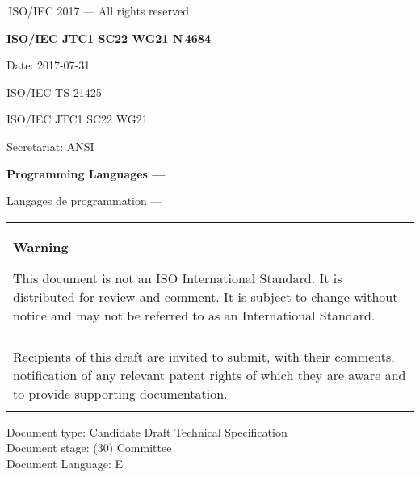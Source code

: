 

\thispagestyle{empty}
{\raisebox{.35ex}{\smaller\copyright}}\,ISO/IEC 2017 --- All rights reserved
\vspace{2ex}

\begin{flushright}
\textbf{ISO/IEC JTC1 SC22 WG21 N\,\LARGE4684}

Date: 2017-07-31

ISO/IEC TS 21425

ISO/IEC JTC1 SC22 WG21

Secretariat: ANSI

\end{flushright}

\vfill

\textbf{\LARGE Programming Languages --- \doctitle}

Langages de programmation --- \frtitle

\vfill

\begin{tabular}{|p{\hsize}|}
\hline
\begin{center}
\textbf{Warning}
\end{center}

\vspace{2ex}

This document is not an ISO International Standard. It is distributed
for review and comment. It is subject to change without notice and may
not be referred to as an International Standard.\\\\

Recipients of this draft are invited to submit, with their comments,
notification of any relevant patent rights of which they are aware
and to provide supporting documentation.\\\\
\hline
\end{tabular}

\vfill
\noindent
Document type: Candidate Draft Technical Specification\\
Document stage: (30) Committee\\
Document Language: E
\pagebreak

\thispagestyle{cpppage}

